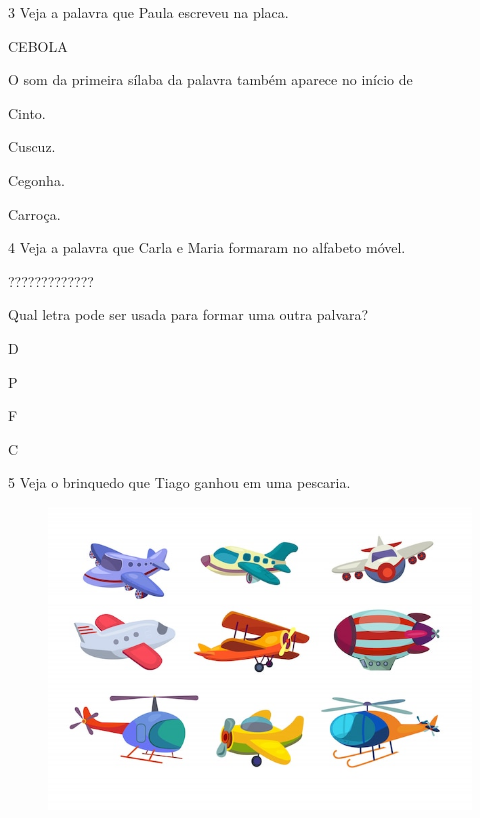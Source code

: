 \pagebreak
\num{3} Veja a palavra que Paula escreveu na placa.

\begin{myquote}
CEBOLA
\end{myquote}

O som da primeira sílaba da palavra também aparece no início de

\begin{escolha}
\item Cinto.

\item Cuscuz.

\item Cegonha.

\item Carroça.
\end{escolha}


\num{4} Veja a palavra que Carla e Maria formaram no alfabeto móvel.

\begin{myquote}
?????????????
\end{myquote}

Qual letra pode ser usada para formar uma outra palvara?

\begin{escolha}
\item D

\item P

\item F

\item C
\end{escolha}

\pagebreak
\num{5} Veja o brinquedo que Tiago ganhou em uma pescaria.

\begin{figure}[htpb!]
\centering
\includegraphics[width=.5\textwidth]{media/image177.jpeg}
\end{figure}


